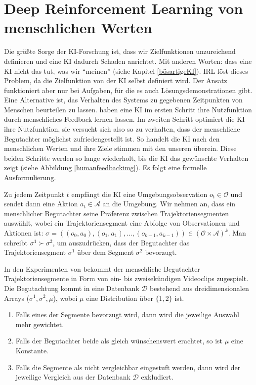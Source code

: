 \section{Deep Reinforcement Learning von menschlichen Werten}
Die größte Sorge der KI-Forschung ist, dass wir Zielfunktionen unzureichend definieren und eine KI dadurch Schaden anrichtet. Mit anderen Worten: dass eine KI nicht das tut, was wir \enquote{meinen} (siehe Kapitel \ref{bösartigeKI}). IRL löst dieses Problem, da die Zielfunktion von der KI selbst definiert wird. Der Ansatz funktioniert aber nur bei Aufgaben, für die es auch Lösungsdemonstrationen gibt. Eine Alternative ist, das Verhalten des Systems zu gegebenen Zeitpunkten von Menschen beurteilen zu lassen. \citeauthor{christiano_deep_2017} haben eine KI im ersten Schritt ihre Nutzfunktion durch menschliches Feedback lernen lassen. Im zweiten Schritt optimiert die KI ihre Nutzfunktion, sie versucht sich also so zu verhalten, dass der menschliche Begutachter möglichst zufriedengestellt ist. So handelt die KI nach den menschlichen Werten und ihre Ziele stimmen mit den unseren überein. Diese beiden Schritte werden so lange wiederholt, bis die KI das gewünschte Verhalten zeigt (siehe Abbildung \ref{humanfeedbackimg}).  Es folgt eine formelle Ausformulierung.

Zu jedem Zeitpunkt $t$ empfängt die KI eine Umgebungsobservation $o_t \in \mathcal{O}$ und sendet dann eine Aktion $a_t \in \mathcal{A}$ an die Umgebung. Wir nehmen an, dass ein menschlicher Begutachter seine Präferenz zwischen Trajektoriensegmenten auswählt, wobei ein Trajektoriensegment eine Abfolge von Observationen und Aktionen ist: $\sigma = ((o_0,a_0),(o_1,a_1),...,(o_{k-1},a_{k-1})) \in (\mathcal{O} \times \mathcal{A})^k$. Man schreibt $\sigma^1 \succ \sigma^2$, um auszudrücken, dass der Begutachter das Trajektoriensegment $\sigma^1$ über dem Segment $\sigma^2$ bevorzugt. 

In den Experimenten von \citeauthor{christiano_deep_2017} bekommt der menschliche Begutachter Trajektoriensegmente in Form von ein- bis zweisekündigen Videoclips zugespielt. Die Begutachtung kommt in eine Datenbank $\mathcal{D}$ bestehend aus dreidimensionalen Arrays ($\sigma^1,\sigma^2,\mu$), wobei $\mu$ eine Distribution über $\{1,2\}$ ist.

\begin{enumerate}
\item Falls eines der Segmente bevorzugt wird, dann wird die jeweilige Auswahl mehr gewichtet.
\item Falls der Begutachter beide als gleich wünschenswert erachtet, so ist $\mu$ eine Konstante.
\item Falls die Segmente als nicht vergleichbar eingestuft werden, dann wird der jeweilige Vergleich aus der Datenbank $\mathcal{D}$ exkludiert.
\end{enumerate}
  
